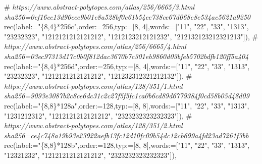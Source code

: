 \documentclass[
  10pt,
  letterpaper,
]{article}
\newenvironment{Shaded}{}{}
\newcommand{\CommentTok}[1]{\textcolor[rgb]{0.38,0.63,0.69}{\textit{#1}}}
\newcommand{\ExtensionTok}[1]{#1}
\newcommand{\FloatTok}[1]{\textcolor[rgb]{0.25,0.63,0.44}{#1}}
\newcommand{\NormalTok}[1]{#1}
\newcommand{\OperatorTok}[1]{\textcolor[rgb]{0.40,0.40,0.40}{#1}}
\newcommand{\StringTok}[1]{\textcolor[rgb]{0.25,0.44,0.63}{#1}}
\newcommand{\VariableTok}[1]{\textcolor[rgb]{0.10,0.09,0.49}{#1}}
\begin{document}
\begin{Shaded}
\begin{Highlighting}[]
\NormalTok{\#}\CommentTok{ https://www.abstract{-}polytopes.com/atlas/256/6665/3.html sha256=0ef16ce13d96eee9b01e8a528bf0e61b54ee738ce67d068c8e534ac5621a9250}
\ExtensionTok{rec}\NormalTok{(}\VariableTok{label}\OperatorTok{:=}\StringTok{"\{8,4\}*256c"}\OperatorTok{,}\VariableTok{order}\OperatorTok{:=}\FloatTok{256}\OperatorTok{,}\VariableTok{typ}\OperatorTok{:=}\NormalTok{[}\FloatTok{8}\OperatorTok{,} \FloatTok{4}\NormalTok{]}\OperatorTok{,}\VariableTok{words}\OperatorTok{:=}\NormalTok{[}\StringTok{"11"}\OperatorTok{,} \StringTok{"22"}\OperatorTok{,} \StringTok{"33"}\OperatorTok{,} \StringTok{"1313"}\OperatorTok{,} \StringTok{"23232323"}\OperatorTok{,} \StringTok{"1212121212121212"}\OperatorTok{,} \StringTok{"1212123212121232"}\OperatorTok{,} \StringTok{"212132123212321213"}\NormalTok{])}\OperatorTok{,}
\NormalTok{\#}\CommentTok{ https://www.abstract{-}polytopes.com/atlas/256/6665/4.html sha256=03ec97313d17c0b0f812dac3670b7c301eb9860d03bfeb5702bdfb120ff5a404}
\ExtensionTok{rec}\NormalTok{(}\VariableTok{label}\OperatorTok{:=}\StringTok{"\{8,4\}*256d"}\OperatorTok{,}\VariableTok{order}\OperatorTok{:=}\FloatTok{256}\OperatorTok{,}\VariableTok{typ}\OperatorTok{:=}\NormalTok{[}\FloatTok{8}\OperatorTok{,} \FloatTok{4}\NormalTok{]}\OperatorTok{,}\VariableTok{words}\OperatorTok{:=}\NormalTok{[}\StringTok{"11"}\OperatorTok{,} \StringTok{"22"}\OperatorTok{,} \StringTok{"33"}\OperatorTok{,} \StringTok{"1313"}\OperatorTok{,} \StringTok{"23232323"}\OperatorTok{,} \StringTok{"1212121212121212"}\OperatorTok{,} \StringTok{"121232312321212132"}\NormalTok{])}\OperatorTok{,}
\NormalTok{\#}\CommentTok{ https://www.abstract{-}polytopes.com/atlas/128/351/1.html sha256=9093e3087b2c8ce6dc31c2c27f5f5fc1ca0b6cd89d6779384f0cd58b05d48d09}
\ExtensionTok{rec}\NormalTok{(}\VariableTok{label}\OperatorTok{:=}\StringTok{"\{8,8\}*128a"}\OperatorTok{,}\VariableTok{order}\OperatorTok{:=}\FloatTok{128}\OperatorTok{,}\VariableTok{typ}\OperatorTok{:=}\NormalTok{[}\FloatTok{8}\OperatorTok{,} \FloatTok{8}\NormalTok{]}\OperatorTok{,}\VariableTok{words}\OperatorTok{:=}\NormalTok{[}\StringTok{"11"}\OperatorTok{,} \StringTok{"22"}\OperatorTok{,} \StringTok{"33"}\OperatorTok{,} \StringTok{"1313"}\OperatorTok{,} \StringTok{"1231212312"}\OperatorTok{,} \StringTok{"1212121212121212"}\OperatorTok{,} \StringTok{"2323232323232323"}\NormalTok{])}\OperatorTok{,}
\NormalTok{\#}\CommentTok{ https://www.abstract{-}polytopes.com/atlas/128/351/2.html sha256=ce4c748a19b93e23922aefb13fc12d10fc09b54dc12cb699a4fd23ad7261f3bb}
\ExtensionTok{rec}\NormalTok{(}\VariableTok{label}\OperatorTok{:=}\StringTok{"\{8,8\}*128b"}\OperatorTok{,}\VariableTok{order}\OperatorTok{:=}\FloatTok{128}\OperatorTok{,}\VariableTok{typ}\OperatorTok{:=}\NormalTok{[}\FloatTok{8}\OperatorTok{,} \FloatTok{8}\NormalTok{]}\OperatorTok{,}\VariableTok{words}\OperatorTok{:=}\NormalTok{[}\StringTok{"11"}\OperatorTok{,} \StringTok{"22"}\OperatorTok{,} \StringTok{"33"}\OperatorTok{,} \StringTok{"1313"}\OperatorTok{,} \StringTok{"12321232"}\OperatorTok{,} \StringTok{"1212121212121212"}\OperatorTok{,} \StringTok{"2323232323232323"}\NormalTok{])}\OperatorTok{,}

\end{Highlighting}
\end{Shaded}
\end{document}
